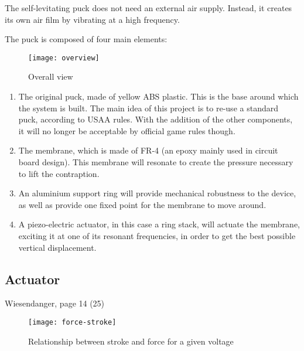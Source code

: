 
The self-levitating puck does not need an external air supply. Instead, it
creates its own air film by vibrating at a high frequency.

The puck is composed of four main elements:

\begin{figure}[h]
  \begin{center}
    \texttt{[image: overview]}
  \end{center}
  \caption{Overall view}
  \label{fig:overview}
\end{figure}

\begin{enumerate}[A]
  \item The original puck, made of yellow ABS plastic. This is the base around
    which the system is built. The main idea of this project is to re-use a
    standard puck, according to USAA rules. With the addition of the other
    components, it will no longer be acceptable by official game rules though.
  \item The membrane, which is made of FR-4 (an epoxy mainly used in circuit
    board design). This membrane will resonate to create the pressure necessary
    to lift the contraption.
  \item An aluminium support ring will provide mechanical robustness to the
    device, as well as provide one fixed point for the membrane to move around.
  \item A piezo-electric actuator, in this case a ring stack, will actuate
    the membrane, exciting it at one of its resonant frequencies, in order to
    get the best possible vertical displacement.
\end{enumerate}

\subsection{Actuator}

Wiesendanger, page 14 (25)


\begin{figure}[h]
  \begin{center}
    \texttt{[image: force-stroke]}
  \end{center}
  \caption{Relationship between stroke and force for a given voltage}
  \label{fig:force-stroke}
\end{figure}

